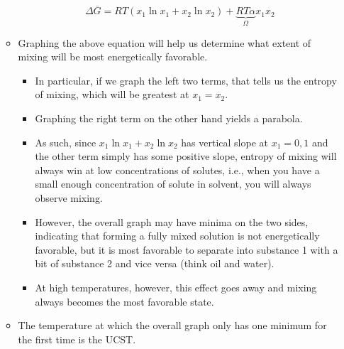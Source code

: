 \documentclass[../notes.tex]{subfiles}
\begin{document}
\begin{itemize}
\begin{itemize}
        \begin{equation*}
            \Delta\overline{G} = RT(x_1\ln x_1+x_2\ln x_2)+\underbrace{RT\alpha}_\Omega x_1x_2
        \end{equation*}
        \item Graphing the above equation will help us determine what extent of mixing will be most energetically favorable.
        \begin{itemize}
            \item In particular, if we graph the left two terms, that tells us the entropy of mixing, which will be greatest at $x_1=x_2$.
            \item Graphing the right term on the other hand yields a parabola.
            \item As such, since $x_1\ln x_1+x_2\ln x_2$ has vertical slope at $x_1=0,1$ and the other term simply has some positive slope, entropy of mixing will always win at low concentrations of solutes, i.e., when you have a small enough concentration of solute in solvent, you will always observe mixing.
            \item However, the overall graph may have minima on the two sides, indicating that forming a fully mixed solution is not energetically favorable, but it is most favorable to separate into substance 1 with a bit of substance 2 and vice versa (think oil and water).
            \item At high temperatures, however, this effect goes away and mixing always becomes the most favorable state.
        \end{itemize}
        \item The temperature at which the overall graph only has one minimum for the first time is the UCST.
    \end{itemize}
\end{itemize}
\end{document}

